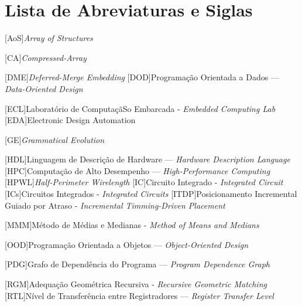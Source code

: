 \chapter * {Lista de Abreviaturas e Siglas}
\thispagestyle{empty}
\label{acro}


\begin{acronym}
\setlength{\parskip}{0ex}
\setlength{\itemsep}{1ex}


\renewcommand{\baselinestretch}{0.25}%
\large\normalsize%



[AoS]{\textit{Array of Structures}}

[CA]{\textit{Compressed-Array}}

[DME]{\textit{Deferred-Merge Embedding}}
[DOD]{Programação Orientada a Dados --- \textit{Data-Oriented Design}}

[ECL]{Laboratório de ComputaçãSo Embarcada - \textit{Embedded Computing Lab}}
[EDA]{Electronic Design Automation}


[GE]{\textit{Grammatical Evolution}}

[HDL]{Linguagem de Descrição de Hardware --- \textit{Hardware Description Language}}
[HPC]{Computação de Alto Desempenho --- \textit{High-Performance Computing}}
[HPWL]{\textit{Half-Perimeter Wirelength}}
[IC]{Circuito Integrado - \textit{Integrated Circuit}}
[ICs]{Circuitos Integrados - \textit{Integrated Circuits}}
[ITDP]{Posicionamento Incremental Guiado por Atraso - \textit{Incremental Timming-Driven Placement}}



[MMM]{Método de Médias e Medianas - \textit{Method of Means and Medians}}


[OOD]{Programação Orientada a Objetos --- \textit{Object-Oriented Design}}

[PDG]{Grafo de Dependência do Programa --- \textit{Program Dependence Graph}}

[RGM]{Adequação Geométrica Recursiva - \textit{Recursive Geometric Matching}}
[RTL]{Nível de Transferência entre Registradores --- \textit{Register Transfer Level}}


\end{acronym}
